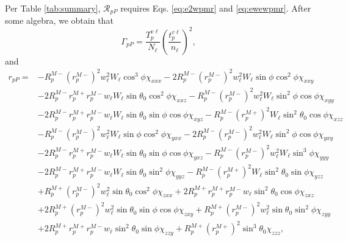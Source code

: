 Per Table \ref{tab:summary}, $\mathcal{R}_{pP}$ requires Eqs. \eqref{eq:e2wpmr}
and \eqref{eq:ewewpmr}. After some algebra, we obtain that
\begin{equation}\label{mc78}
\Gamma_{pP} =
\frac{T^{v\ell}_{p}}{N_{\ell}}
\left(\frac{t^{v\ell}_{p}}{n_{\ell}}\right)^{2}
,
\end{equation}
and
\begin{equation}
\begin{split}
r_{pP}
=
&-R^{M-}_{p}\left(r^{M-}_{p}\right)^{2}w^{2}_{\ell}W_{\ell}\cos^{3}\phi
\chi_{xxx}
 -2R^{M-}_{p}\left(r^{M-}_{p}\right)^{2}w^{2}_{\ell}W_{\ell}\sin\phi\cos^{2}\phi
\chi_{xxy}\\
&-2R^{M-}_{p}r^{M+}_{p}r^{M-}_{p}w_{\ell}W_{\ell}\sin\theta_{0}\cos^{2}\phi
\chi_{xxz}
 -R^{M-}_{p}\left(r^{M-}_{p}\right)^{2}w^{2}_{\ell}W_{\ell}\sin^{2}\phi\cos\phi
\chi_{xyy}\\
&-2R^{M-}_{p}r^{M+}_{p}r^{M-}_{p}w_{\ell}W_{\ell}\sin\theta_{0}\sin\phi\cos\phi
\chi_{xyz}
 -R^{M-}_{p}\left(r^{M+}_{p}\right)^{2}W_{\ell}\sin^{2}\theta_{0}\cos\phi
\chi_{xzz}\\
&-R^{M-}_{p}\left(r^{M-}_{p}\right)^{2}w^{2}_{\ell}W_{\ell}\sin\phi\cos^{2}\phi
\chi_{yxx}
 -2R^{M-}_{p}\left(r^{M-}_{p}\right)^{2}w^{2}_{\ell}W_{\ell}\sin^{2}\phi\cos\phi
\chi_{yxy}\\
&-2R^{M-}_{p}r^{M+}_{p}r^{M-}_{p}w_{\ell}W_{\ell}\sin\theta_{0}\sin\phi\cos\phi
\chi_{yxz}
 -R^{M-}_{p}\left(r^{M-}_{p}\right)^{2}w^{2}_{\ell}W_{\ell}\sin^{3}\phi
\chi_{yyy}\\
&-2R^{M-}_{p}r^{M+}_{p}r^{M-}_{p}w_{\ell}W_{\ell}\sin\theta_{0}\sin^{2}\phi
\chi_{yyz}
 -R^{M-}_{p}\left(r^{M+}_{p}\right)^{2}W_{\ell}\sin^{2}\theta_{0}\sin\phi
\chi_{yzz}\\
&+R^{M+}_{p}\left(r^{M-}_{p}\right)^{2}w^{2}_{\ell}\sin\theta_{0}\cos^{2}\phi
\chi_{zxx}
 +2R^{M+}_{p}r^{M+}_{p}r^{M-}_{p}w_{\ell}\sin^{2}\theta_{0}\cos\phi
\chi_{zxz}\\
&+2R^{M+}_{p}\left(r^{M-}_{p}\right)^{2}w^{2}_{\ell}\sin\theta_{0}\sin\phi
\cos\phi\chi_{zxy}
 +R^{M+}_{p}\left(r^{M-}_{p}\right)^{2}w^{2}_{\ell}\sin\theta_{0}\sin^{2}\phi
\chi_{zyy}\\
&+2R^{M+}_{p}r^{M+}_{p}r^{M-}_{p}w_{\ell}\sin^{2}\theta_{0}\sin\phi
\chi_{zzy}
 +R^{M+}_{p}\left(r^{M+}_{p}\right)^{2}\sin^{3}\theta_{0}
\chi_{zzz}
,
\end{split}
\end{equation}

